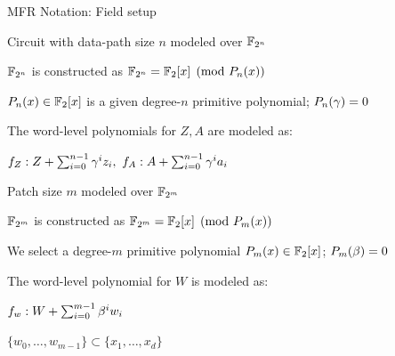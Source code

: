 \begin{frame}{\large MFR Notation: Field setup}
\bi
	\item Circuit with data-path size $n$ modeled over ${\mathbb{F}}_{2^n}$
	\bi
		\item ${\mathbb{F}}_{2^n}$ is constructed as ${\mathbb{F}}_{2^n} = {\mathbb{F}}_{2}[x]\pmod{P_n(x)}$
		\bi
			\item $P_n(x) \in {\mathbb{F}}_2[x]$ is a given degree-$n$ primitive polynomial; $P_n(\gamma) =0$ 
		\ei
		\item  The word-level polynomials for $Z,A$ are modeled as:
		\bi
			\item $f_Z: Z + \sum_{i=0}^{n-1}\gamma^iz_i,~f_A: A + \sum_{i=0}^{n-1}\gamma^ia_i$ 
		\ei
	\ei 
	\vspace{0.1in}
	\vspace{0.1in}
	\item Patch size $m$ modeled over ${\mathbb{F}}_{2^m}$
	\bi
		\item ${\mathbb{F}}_{2^m}$ is constructed as ${\mathbb{F}}_{2^m} = {\mathbb{F}}_{2}[x]\pmod{P_m(x)}$
		\bi
			\item We select a degree-$m$ primitive polynomial $P_m(x)\in {\mathbb{F}}_2[x]$; $P_m(\beta) =0$ 
		\ei
		\item  The word-level polynomial for $W$ is modeled as:
		\bi
			\item $f_w: W + \sum_{i=0}^{m-1}\beta^iw_i$
			\item $\{w_0,\dots,w_{m-1}\} \subset \{x_1,\dots,x_d\}$
		\ei
	\ei
\ei
\end{frame}



